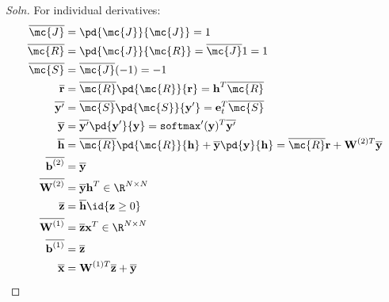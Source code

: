 \documentclass{article}
\begin{document}
	\subsubsection{}
	\begin{proof}[Soln]
		For individual derivatives:
		\begin{align}
			\overline{\mc{J}} &= \pd{\mc{J}}{\mc{J}} = 1 \\
			\overline{\mc{R}} &= \pd{\mc{J}}{\mc{R}} = \overline{\mc{J}}1 = 1 \\
			\overline{\mc{S}} &= \overline{\mc{J}} (-1) = -1 \\
			\overline{\textbf{r}} &= \overline{\mc{R}} \pd{\mc{R}}{\textbf{r}} = \textbf{h}^T \overline{\mc{R}} \\
			\overline{\textbf{y}'} &= \overline{\mc{S}} \pd{\mc{S}}{\textbf{y}'} = \textbf{e}_t^T \overline{\mc{S}} \\
			\overline{\textbf{y}} &= \overline{\textbf{y}'} \pd{\textbf{y}'}{\textbf{y}} = \texttt{softmax}'(\textbf{y})^T\overline{\textbf{y}'} \\
			\overline{\textbf{h}} &= \overline{\mc{R}} \pd{\mc{R}}{\textbf{h}} + \overline{\textbf{y}} \pd{\textbf{y}}{\textbf{h}} = \overline{\mc{R}} \textbf{r} + \textbf{W}^{(2)T} \overline{\textbf{y}}\\
			\overline{\textbf{b}^{(2)}} &= \overline{\textbf{y}} \\
			\overline{\textbf{W}^{(2)}} &= \overline{\textbf{y}} \textbf{h}^T \in \R^{N \times N} \\
			\overline{\textbf{z}} &= \overline{\textbf{h}} \id{\textbf{z} \geq 0} \\
			\overline{\textbf{W}^{(1)}} &= \overline{\textbf{z}} \textbf{x}^T \in \R^{N \times N} \\
			\overline{\textbf{b}^{(1)}} &= \overline{\textbf{z}} \\
			\overline{\textbf{x}} &= \textbf{W}^{(1)T}\overline{\textbf{z}} + \overline{\textbf{y}} 
		\end{align}

\end{proof}
\end{document}
